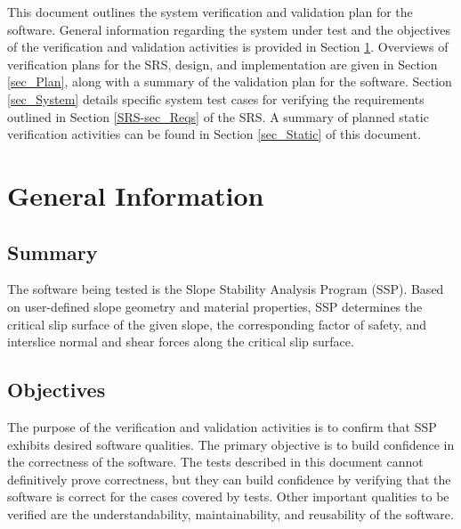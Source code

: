 \documentclass[12pt, titlepage]{article}
\newcommand{\progname}{SSP}
\begin{document}
\newpage

\tableofcontents

\listoftables

\listoffigures

\newpage


\noindent This document outlines the system verification and validation plan 
for the software. General information regarding the system under test and the 
objectives of the verification and validation activities is provided in Section 
\ref{sec_GenInfo}. Overviews of verification plans for the SRS, design, and 
implementation are given in Section \ref{sec_Plan}, along with a summary of the 
validation plan for the software. Section \ref{sec_System} details specific  
system test cases for verifying the requirements outlined in Section 
\ref{SRS-sec_Reqs} of the SRS. A summary of planned static verification 
activities can be found in Section \ref{sec_Static} of this document.

\section{General Information} \label{sec_GenInfo}

\subsection{Summary}

\noindent The software being tested is the Slope Stability Analysis Program 
(\progname{}). Based on user-defined slope geometry and material properties, 
\progname{} determines the critical slip surface of the given slope, the 
corresponding factor of safety, and interslice normal and shear forces along 
the critical slip surface.

\subsection{Objectives}

\noindent The purpose of the verification and validation activities is to 
confirm that \progname{} exhibits desired software qualities. The primary 
objective is to build confidence in the correctness of the software. The tests 
described in this document cannot definitively prove correctness, but they can 
build confidence by verifying that the software is correct for the cases 
covered by tests. Other important qualities to be verified are the 
understandability, maintainability, and reusability of the software.
\end{document}

